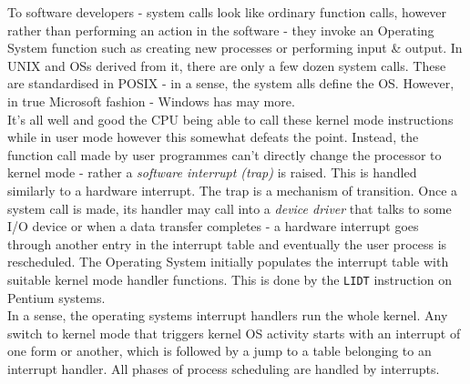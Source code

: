 To software developers - system calls look like ordinary function calls, however rather than performing an action in the software - they invoke an Operating System function such as creating new processes or performing input \& output. In UNIX and OSs derived from it, there are only a few dozen system calls. These are standardised in POSIX - in a sense, the system alls define the OS. However, in true Microsoft fashion - Windows has may more.\\

It's all well and good the CPU being able to call these kernel mode instructions while in user mode however this somewhat defeats the point. Instead, the function call made by user programmes can't directly change the processor to kernel mode - rather a \textit{software interrupt (trap)} is raised. This is handled similarly to a hardware interrupt. The trap is a mechanism of transition. Once a system call is made, its handler may call into a \textit{device driver} that talks to some I/O device or when a data transfer completes - a hardware interrupt goes through another entry in the interrupt table and eventually the user process is rescheduled. The Operating System initially populates the interrupt table with suitable kernel mode handler functions. This is done by the \verb|LIDT| instruction on Pentium systems.\\

In a sense, the operating systems interrupt handlers run the whole kernel. Any switch to kernel mode that triggers kernel OS activity starts with an interrupt of one form or another, which is followed by a jump to a table belonging to an interrupt handler. All phases of process scheduling are handled by interrupts.